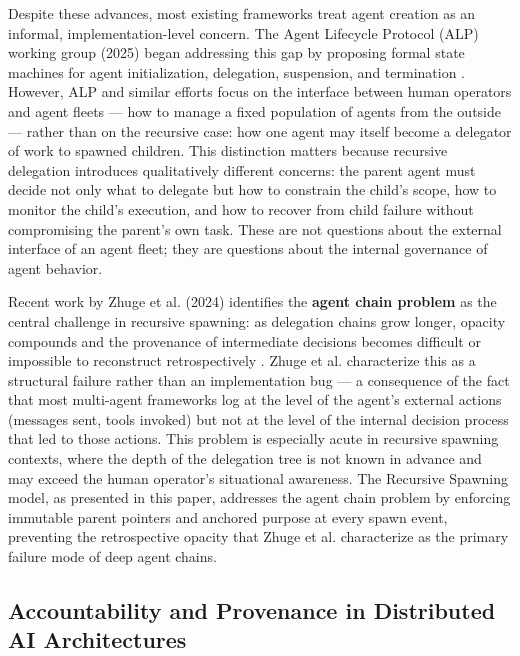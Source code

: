 Despite these advances, most existing frameworks treat agent creation as an informal, implementation-level concern. The Agent Lifecycle Protocol (ALP) working group (2025) began addressing this gap by proposing formal state machines for agent initialization, delegation, suspension, and termination \cite{alp2025}. However, ALP and similar efforts focus on the interface between human operators and agent fleets — how to manage a fixed population of agents from the outside — rather than on the recursive case: how one agent may itself become a delegator of work to spawned children. This distinction matters because recursive delegation introduces qualitatively different concerns: the parent agent must decide not only what to delegate but how to constrain the child's scope, how to monitor the child's execution, and how to recover from child failure without compromising the parent's own task. These are not questions about the external interface of an agent fleet; they are questions about the internal governance of agent behavior.

Recent work by Zhuge et al. (2024) identifies the \textbf{agent chain problem} as the central challenge in recursive spawning: as delegation chains grow longer, opacity compounds and the provenance of intermediate decisions becomes difficult or impossible to reconstruct retrospectively \cite{zhuge2024}. Zhuge et al. characterize this as a structural failure rather than an implementation bug — a consequence of the fact that most multi-agent frameworks log at the level of the agent's external actions (messages sent, tools invoked) but not at the level of the internal decision process that led to those actions. This problem is especially acute in recursive spawning contexts, where the depth of the delegation tree is not known in advance and may exceed the human operator's situational awareness. The Recursive Spawning model, as presented in this paper, addresses the agent chain problem by enforcing immutable parent pointers and anchored purpose at every spawn event, preventing the retrospective opacity that Zhuge et al. characterize as the primary failure mode of deep agent chains.

\subsection{Accountability and Provenance in Distributed AI Architectures}
\label{sec:provenance}

